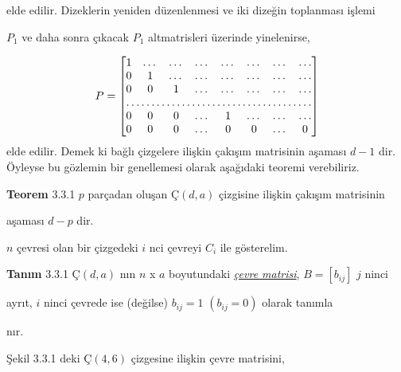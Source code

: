 \documentclass[11pt, twoside, a4paper]{article}
\numberwithin{equation}{section}
\numberwithin{figure}{section}
\begin{document}
elde edilir. Dizeklerin yeniden düzenlenmesi ve iki dizeğin toplanması işlemi

$P_1$ ve daha sonra çıkacak $P_1$ altmatrisleri üzerinde yinelenirse, 

\[
P = 
\begin{bmatrix}
    1 & \dots & \dots & \dots & \dots & \dots & \dots & \dots \\
    0 & 1 & \dots & \dots & \dots & \dots & \dots & \dots  \\
    0 & 0 & 1 & \dots & \dots & \dots & \dots & \dots \\
    \hdotsfor{8} \\
    0 & 0 & 0 & \dots & 1 & \dots & \dots & \dots \\
    0 & 0 & 0 & \dots & 0 & 0 & \dots & 0 \\
\end{bmatrix}
\] 
elde edilir. Demek ki bağlı çizgelere ilişkin çakışım matrisinin aşaması $d-1$ dir. 
Öyleyse bu gözlemin bir genellemesi olarak aşağıdaki teoremi verebiliriz. 

\hspace{-0.75cm} \textbf{Teorem} \hspace{0.7cm} 3.3.1 \hspace{0.7cm} $p$ parçadan oluşan Ç$(d,a)$ çizgisine ilişkin çakışım matrisinin 

\hspace{3.4cm} aşaması $d-p$ dir. \vspace{0.5cm}

\hspace{-0.75cm} $n$ çevresi olan bir çizgedeki $i$ nci çevreyi $C_i$ ile gösterelim. \vspace{0.25cm}

\hspace{-0.75cm} \textbf{Tanım} \hspace{0.7 cm} 3.3.1 \hspace{0.7cm} Ç$(d,a)$ nın $n$ x $a$ boyutundaki \textit{\underline{çevre matrisi}}, $B = [b_{ij}]$ $j$ ninci \vspace{0.25cm}

\hspace{3.25cm} ayrıt, $i$ ninci çevrede ise (değilse) $b_{ij} = 1$ $(b_{ij} = 0)$ olarak tanımla  \vspace{0.25cm}

\hspace{3.25cm} nır. \vspace{0.25cm}

\hspace{-0.75cm} Şekil 3.3.1 deki Ç$(4,6)$ çizgesine ilişkin çevre matrisini,
\end{document}
